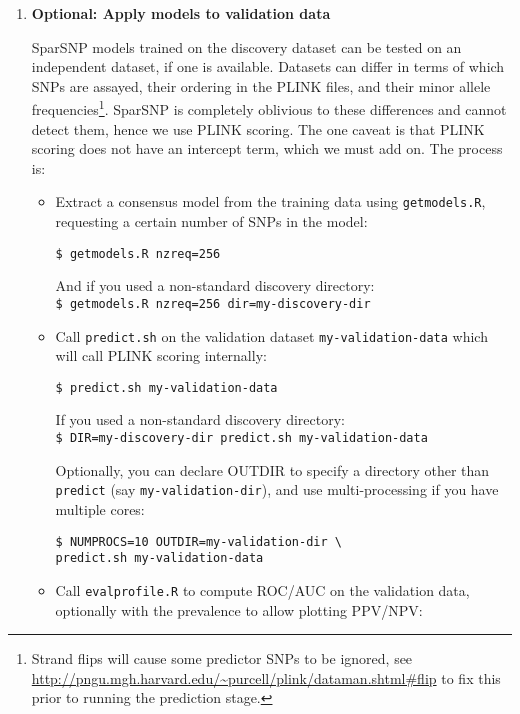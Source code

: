 \documentclass[a4paper,11pt]{article}
\begin{document}
\begin{enumerate}
\begin{itemize}
      \end{itemize}

   \item \textbf{Optional: Apply models to validation data}

      SparSNP models trained on the discovery dataset can be tested on an
      independent dataset, if one is available. Datasets can differ in terms of
      which SNPs are assayed, their ordering in the PLINK files, and their minor
      allele frequencies\footnote{Strand flips will cause some predictor SNPs to
      be ignored, see
      \url{http://pngu.mgh.harvard.edu/~purcell/plink/dataman.shtml\#flip} to
      fix this prior to running the prediction stage.}. SparSNP is completely
      oblivious to these differences and cannot detect them, hence we use PLINK
      scoring. The one caveat is that PLINK scoring does not have an intercept
      term, which we must add on. The process is:
      \begin{itemize}

	 \item Extract a consensus model from the training data using
	 \texttt{getmodels.R}, requesting a certain number of SNPs in the
	 model:

	 \texttt{\$ getmodels.R nzreq=256}

	 And if you used a non-standard discovery directory:\\
	 \texttt{\$ getmodels.R nzreq=256 dir=my-discovery-dir}

	 \item Call \texttt{predict.sh} on the validation dataset
	 \texttt{my-validation-data} which will
	 call PLINK scoring internally:

	 \texttt{\$ predict.sh my-validation-data}

	 If you used a non-standard discovery directory:\\
	 \texttt{\$ DIR=my-discovery-dir predict.sh my-validation-data}

	 Optionally, you can declare OUTDIR to specify a directory other than
	 \texttt{predict} (say \texttt{my-validation-dir}), and use multi-processing if
	 you have multiple cores:

	 \texttt{\$ NUMPROCS=10 OUTDIR=my-validation-dir \textbackslash \\
	    predict.sh my-validation-data}

	 \item Call \texttt{evalprofile.R} to compute ROC/AUC on the
	 validation data, optionally with the prevalence to
	 allow plotting PPV/NPV:


\end{itemize}
\end{enumerate}
\end{document}
